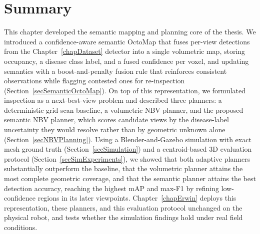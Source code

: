 \section{Summary} \label{secNBVSummary}

This chapter developed the semantic mapping and planning core of the
thesis.
We introduced a confidence-aware semantic OctoMap that fuses per-view
detections from the Chapter~\ref{chapDataset} detector into a single
volumetric map, storing occupancy, a disease class label, and a fused
confidence per voxel, and updating semantics with a boost-and-penalty
fusion rule that reinforces consistent observations while flagging
contested ones for re-inspection (Section~\ref{secSemanticOctoMap}).
On top of this representation, we formulated inspection as a next-best-view
problem and described three planners: a deterministic grid-scan baseline,
a volumetric NBV planner, and the proposed semantic NBV planner, which
scores candidate views by the disease-label uncertainty they would resolve
rather than by geometric unknown alone (Section~\ref{secNBVPlanning}).
Using a Blender-and-Gazebo simulation with exact mesh ground truth
(Section~\ref{secSimulation}) and a centroid-based 3D evaluation protocol
(Section~\ref{secSimExperiments}), we showed that both adaptive planners
substantially outperform the baseline, that the volumetric planner attains
the most complete geometric coverage, and that the semantic planner attains
the best detection accuracy, reaching the highest mAP and max-F1 by
refining low-confidence regions in its later viewpoints.
Chapter~\ref{chapErwin} deploys this representation, these planners, and
this evaluation protocol unchanged on the physical robot, and tests whether
the simulation findings hold under real field conditions.
